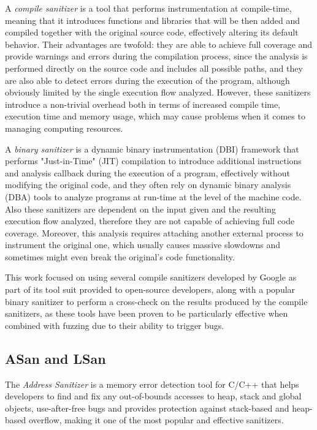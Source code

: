 A \textit{compile sanitizer} is a tool that performs instrumentation at compile-time, meaning that it introduces functions and libraries that will be then added and compiled together with the original source code, effectively altering its default behavior. Their advantages are twofold: they are able to achieve full coverage and provide warnings and errors during the compilation process, since the analysis is performed directly on the source code and includes all possible paths, and they are also able to detect errors during the execution of the program, although obviously limited by the single execution flow analyzed. However, these sanitizers introduce a non-trivial overhead both in terms of increased compile time, execution time and memory usage, which may cause problems when it comes to managing computing resources.

A \textit{binary sanitizer} is a dynamic binary instrumentation (DBI) framework that performs "Just-in-Time" (JIT) compilation to introduce additional instructions and analysis callback during the execution of a program, effectively without modifying the original code, and they often rely on dynamic binary analysis (DBA) tools to analyze programs at run-time at the level of the machine code. Also these sanitizers are dependent on the input given and the resulting execution flow analyzed, therefore they are not capable of achieving full code coverage. Moreover, this analysis requires attaching another external process to instrument the original one, which usually causes massive slowdowns and sometimes might even break the original's code functionality.  

This work focused on using several compile sanitizers developed by Google \cite{san_repo} as part of its tool suit provided to open-source developers, along with a popular binary sanitizer \cite{valgrind_web} to perform a cross-check on the results produced by the compile sanitizers, as these tools have been proven to be particularly effective when combined with fuzzing due to their ability to trigger bugs.




\newpage
\subsection{ASan and LSan}
The \textit{Address Sanitizer} \cite{serebryany2012addresssanitizer} is a memory error detection tool for C/C++ that helps developers to find and fix any out-of-bounds accesses to heap, stack and global objects, use-after-free bugs and provides protection against stack-based and heap-based overflow, making it one of the most popular and effective sanitizers.

